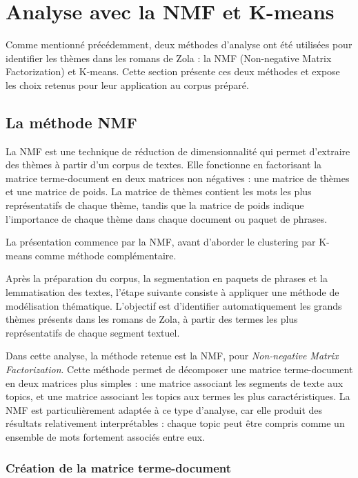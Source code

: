 \section{Analyse avec la NMF et K-means}
Comme mentionné précédemment, deux méthodes d'analyse ont été utilisées pour identifier les thèmes dans les romans de Zola : la NMF (Non-negative Matrix Factorization) et K-means. Cette section présente ces deux méthodes et expose les choix retenus pour leur application au corpus préparé.

\subsection{La méthode NMF}

La NMF est une technique de réduction de dimensionnalité qui permet d'extraire des thèmes à partir d'un corpus de textes. Elle fonctionne en factorisant la matrice terme-document en deux matrices non négatives : une matrice de thèmes et une matrice de poids. La matrice de thèmes contient les mots les plus représentatifs de chaque thème, tandis que la matrice de poids indique l'importance de chaque thème dans chaque document ou paquet de phrases.

La présentation commence par la NMF, avant d'aborder le clustering par K-means comme méthode complémentaire.

Après la préparation du corpus, la segmentation en paquets de phrases et la lemmatisation des textes, l'étape suivante consiste à appliquer une méthode de modélisation thématique. L'objectif est d'identifier automatiquement les grands thèmes présents dans les romans de Zola, à partir des termes les plus représentatifs de chaque segment textuel.

Dans cette analyse, la méthode retenue est la NMF, pour \textit{Non-negative Matrix Factorization}. Cette méthode permet de décomposer une matrice terme-document en deux matrices plus simples : une matrice associant les segments de texte aux topics, et une matrice associant les topics aux termes les plus caractéristiques. La NMF est particulièrement adaptée à ce type d'analyse, car elle produit des résultats relativement interprétables : chaque topic peut être compris comme un ensemble de mots fortement associés entre eux.

\subsubsection{Création de la matrice terme-document}

